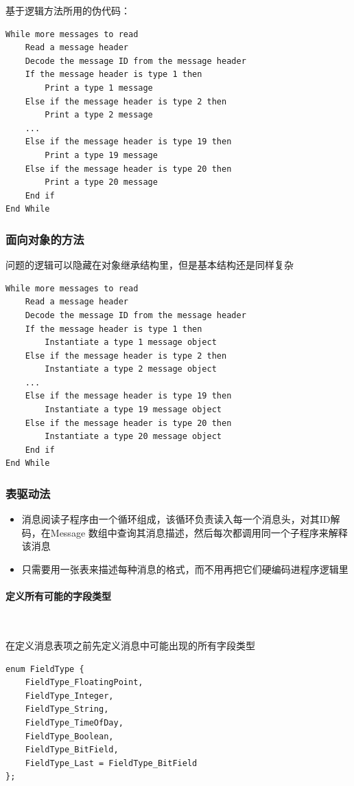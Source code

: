 基于逻辑方法所用的伪代码：
\begin{lstlisting}
While more messages to read
    Read a message header
    Decode the message ID from the message header
    If the message header is type 1 then
        Print a type 1 message
    Else if the message header is type 2 then
        Print a type 2 message
    ...
    Else if the message header is type 19 then
        Print a type 19 message
    Else if the message header is type 20 then
        Print a type 20 message
    End if
End While
\end{lstlisting}

\subsubsection{面向对象的方法}
问题的逻辑可以隐藏在对象继承结构里，但是基本结构还是同样复杂
\begin{lstlisting}
While more messages to read
    Read a message header
    Decode the message ID from the message header
    If the message header is type 1 then
        Instantiate a type 1 message object
    Else if the message header is type 2 then
        Instantiate a type 2 message object
    ...
    Else if the message header is type 19 then
        Instantiate a type 19 message object
    Else if the message header is type 20 then
        Instantiate a type 20 message object
    End if
End While
\end{lstlisting}

\subsubsection{表驱动法}
\begin{itemize}
    \item 消息阅读子程序由一个循环组成，该循环负责读入每一个消息头，对其ID解码，在Message 数组中查询其消息描述，然后每次都调用同一个子程序来解释该消息
    \item 只需要用一张表来描述每种消息的格式，而不用再把它们硬编码进程序逻辑里
\end{itemize}

\paragraph*{定义所有可能的字段类型}~{} \par
在定义消息表项之前先定义消息中可能出现的所有字段类型
\begin{lstlisting}
enum FieldType {
    FieldType_FloatingPoint,
    FieldType_Integer,
    FieldType_String,
    FieldType_TimeOfDay,
    FieldType_Boolean,
    FieldType_BitField,
    FieldType_Last = FieldType_BitField
};
\end{lstlisting}

